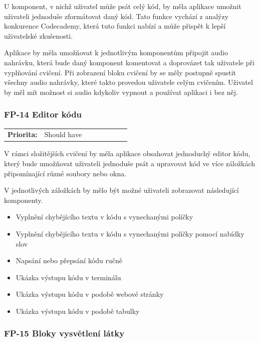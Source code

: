 U komponent, v nichž uživatel může psát celý kód, by měla aplikace umožnit uživateli jednoduše zformátovat daný kód. Tato funkce vychází z analýzy konkurence Codecademy, která tuto funkci nabízí a může přispět k lepší uživatelské zkušenosti.

Aplikace by měla umožňovat k jednotlivým komponentům připojit audio nahrávku, která bude daný komponent komentovat a doprovázet tak uživatele při vyplňování cvičení. Při zobrazení bloku cvičení by se měly postupně spustit všechny audio nahrávky, které takto provedou uživatele celým cvičením. Uživatel by měl mít možnost si audio kdykoliv vypnout a používat aplikaci i bez něj.

\subsubsection{FP-14 Editor kódu}\label{sec:fp-code-editor}

\begin{tabular}{lp{0.7\linewidth}}
    \textbf{Priorita:} & Should have \\
\end{tabular}

V rámci složitějších cvičení by měla aplikace obsahovat jednoduchý editor kódu, který bude umožňovat uživateli jednoduše psát a upravovat kód ve více záložkách připomínající různé soubory nebo okna.

V jednotlivých záložkách by mělo být možné uživateli zobrazovat následující komponenty.

\begin{itemize}
    \item Vyplnění chybějícího textu v kódu s vynechanými políčky
    \item Vyplnění chybějícího textu v kódu s vynechanými políčky pomocí nabídky slov
    \item Napsání nebo přepsání kódu ručně
    \item Ukázka výstupu kódu v terminálu
    \item Ukázka výstupu kódu v podobě webové stránky
    \item Ukázka výstupu kódu v podobě tabulky
\end{itemize}

\subsubsection{FP-15 Bloky vysvětlení látky}\label{sec:fp-explanation-blocks}

